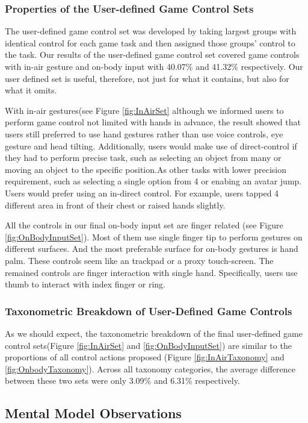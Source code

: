 \documentclass{sigchi}
\begin{document}
   \subsubsection{Properties of the User-defined Game Control Sets}
   The user-defined game control set was developed by taking largest groups with identical control for each game task and then assigned those groups' control to the task. 
   Our results of the user-defined game control set covered game controls with in-air gesture and on-body input with 40.07\% and 41.32\% respectively. Our user defined set is useful, therefore, not just for what it contains, but also for what it omits.

   With in-air gestures(see Figure \ref{fig:InAirSet} although we informed users to perform game control not limited with hands in advance, the result showed that users still preferred to use hand gestures rather than use voice controls, eye gesture and head tilting. Additionally, users would make use of direct-control if they had to perform precise task, such as selecting an object from many or moving an object to the specific position.As other tasks with lower precision requirement, such as selecting a single option from 4 or enabing an avatar jump. Users would prefer using an in-direct control. For example, users tapped 4 different area in front of their chest or raised hands slightly.


    All the controls in our final on-body input set are finger related (see Figure \ref{fig:OnBodyInputSet}). Most of them use single finger tip to perform gestures on different surfaces. And the most preferable surface for on-body gestures is hand palm. These controls seem like an trackpad or a proxy touch-screen. The remained controls are finger interaction with single hand. Specifically, users use thumb to interact with index finger or ring.

   \subsubsection{Taxonometric Breakdown of User-Defined Game Controls}
   As we should expect, the taxonometric breakdown of the final user-defined game control sets(Figure \ref{fig:InAirSet} and \ref{fig:OnBodyInputSet}) are similar to the proportions of all control actions proposed (Figure \ref{fig:InAirTaxonomy} and \ref{fig:OnbodyTaxonomy}). Across all taxonomy categories, the average difference between these two sets were only 3.09\% and 6.31\% respectively.

  \subsection{Mental Model Observations}
\end{document}
